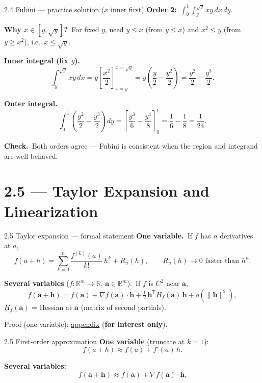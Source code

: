 \documentclass[11pt,aspectratio=169]{beamer}
\newcommand{\InterestOnly}{\textcolor{mAccent}{\textbf{for interest only}}}
\newcommand{\AppendixLink}[1]{%
  \hyperlink{#1}{\textcolor{mAccent}{appendix}}}
\begin{document}
\begin{frame}{2.4 Fubini --- practice solution ($x$ inner first)}
  \footnotesize
  \textbf{Order 2:}\ $\displaystyle\int_0^1\!\int_{y}^{\sqrt{y}} xy\,dx\,dy$.

  \medskip
  \textbf{Why $x\in[y,\sqrt{y}]$?}\
  For fixed $y$, need $y\le x$ (from $y\le x$) and $x^2\le y$ (from $y\ge x^2$), i.e.\ $x\le\sqrt{y}$.

  \medskip
  \textbf{Inner integral (fix $y$).}\
  \[
    \int_{y}^{\sqrt{y}} xy\,dx
    = y\left[\frac{x^2}{2}\right]_{x=y}^{x=\sqrt{y}}
    = y\left(\frac{y}{2}-\frac{y^2}{2}\right)
    = \frac{y^2}{2}-\frac{y^3}{2}.
  \]

  \medskip
  \textbf{Outer integral.}\
  \[
    \int_0^1 \left(\frac{y^2}{2}-\frac{y^3}{2}\right)dy
    = \left[\frac{y^3}{6}-\frac{y^4}{8}\right]_0^1
    = \frac16-\frac18
    = \frac{1}{24}.
  \]

  \medskip
  \textbf{Check.}\
  Both orders agree --- Fubini is consistent when the region and integrand are well behaved.
\end{frame}

\section{2.5 --- Taylor Expansion and Linearization}

\begin{frame}{2.5 Taylor expansion --- formal statement}
  \footnotesize
  \textbf{One variable.}\
  If $f$ has $n$ derivatives at $a$,
  \[
    f(a+h)
    = \sum_{k=0}^{n}\frac{f^{(k)}(a)}{k!}\,h^k + R_n(h),
    \qquad R_n(h)\to 0 \text{ faster than } h^n.
  \]

  \medskip
  \textbf{Several variables} ($f\colon\mathbb R^m\to\mathbb R$, $\mathbf{a}\in\mathbb R^m$).\
  If $f$ is $C^2$ near $\mathbf{a}$,
  \[
    f(\mathbf{a}+\mathbf{h})
    = f(\mathbf{a})
      + \nabla f(\mathbf{a})\cdot\mathbf{h}
      + \tfrac12\,\mathbf{h}^{\mathsf T}H_f(\mathbf{a})\,\mathbf{h}
      + o(\|\mathbf{h}\|^2),
  \]
  {\scriptsize $H_f(\mathbf{a})$ = Hessian at $\mathbf{a}$ (matrix of second partials).}

  \medskip
  {\scriptsize Proof (one variable):
  \AppendixLink{sec:taylor-proof} (\InterestOnly).}
\end{frame}

\begin{frame}{2.5 First-order approximation}
  \footnotesize
  \textbf{One variable} (truncate at $k=1$):
  \[
    f(a+h)\approx f(a)+f'(a)\,h.
  \]

  \medskip
  \textbf{Several variables:}
  \[
    f(\mathbf{a}+\mathbf{h})
    \approx f(\mathbf{a})+\nabla f(\mathbf{a})\cdot\mathbf{h}.
  \]
\end{frame}
\end{document}
